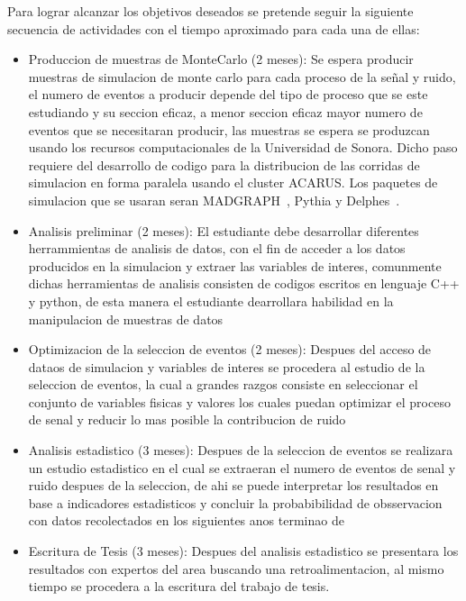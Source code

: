 Para lograr alcanzar los objetivos deseados se pretende seguir la siguiente secuencia de actividades con el tiempo aproximado para cada una de ellas:

\begin{itemize}
  
\item Produccion de muestras de MonteCarlo (2 meses): Se espera producir muestras de simulacion de monte carlo para cada proceso de la se\~nal y ruido, el numero de eventos a producir depende del tipo de proceso que se este estudiando y su seccion eficaz, a menor seccion eficaz mayor numero de eventos que se necesitaran producir, las muestras se espera se produzcan usando los recursos computacionales de la Universidad de Sonora. Dicho paso requiere del desarrollo de codigo para la distribucion de las corridas de simulacion en forma paralela usando el cluster ACARUS. Los paquetes de simulacion que se usaran seran MADGRAPH~\cite{Alwall:2007st}, Pythia y Delphes~\cite{deFavereau2014}.

\item Analisis preliminar (2 meses): El estudiante debe desarrollar diferentes herrammientas de analisis de datos, con el fin de acceder a los datos producidos en la simulacion y extraer las variables de interes, comunmente dichas herramientas de analisis consisten de codigos escritos en lenguaje C++ y python, de esta manera el estudiante dearrollara habilidad en la manipulacion de muestras de datos 

\item Optimizacion de la seleccion de eventos (2 meses): Despues del acceso de dataos de simulacion y variables de interes se procedera al estudio de la seleccion de eventos, la cual a grandes razgos consiste en seleccionar el conjunto de variables fisicas y valores los cuales puedan optimizar el proceso de senal y reducir lo mas posible la contribucion de ruido 

\item Analisis estadistico (3 meses): Despues de la seleccion de eventos se realizara un estudio estadistico en el cual se extraeran el numero de eventos de senal y ruido despues de la seleccion, de ahi se puede interpretar los resultados en base a indicadores estadisticos y concluir la probabibilidad de obsservacion con datos recolectados en los siguientes anos terminao de

\item Escritura de Tesis (3 meses): Despues del analisis estadistico se presentara los resultados con expertos del area buscando una retroalimentacion, al mismo tiempo se procedera a la escritura del trabajo de tesis. 

\end{itemize}
  
